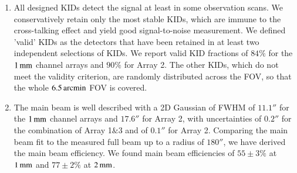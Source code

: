 \documentclass[traditionalabstract]{aa}
\begin{document}
\begin{enumerate}
\item %
  All designed KIDs detect the
  signal at least in some observation
  scans. We conservatively retain only the most stable KIDs, which are
  immune to the cross-talking effect and yield good signal-to-noise
  measurement. We defined 'valid' KIDs as the detectors that have been
  retained in at least two independent selections of KIDs.
  We report valid KID fractions of $84\%$
  for the $1\,\rm{mm}$ channel arrays and $90\%$ for Array 2. The other
  KIDs, which do not meet the validity criterion, are randomly
  distributed across the FOV, so that the whole $6.5\,\rm{arcmin}$ FOV is
  covered.
  \vspace{1mm}
\item %
  The main beam is well described with a 2D
  Gaussian of FWHM of $11.1''$ for the $1\,\rm{mm}$ channel arrays
  and $17.6''$ for Array 2, with uncertainties of $0.2''$ for the
  combination of Array 1$\&$3 and of $0.1''$ for Array 2.
  Comparing the main beam fit to the measured full beam up to a radius of $180''$, we have derived the
  main beam efficiency. We found main beam
  efficiencies of $55 \pm 3 \%$ at $1\,\rm{mm}$ and $77 \pm 2 \%$ at
  $2\,\rm{mm}$.

\end{enumerate}
\end{document}
